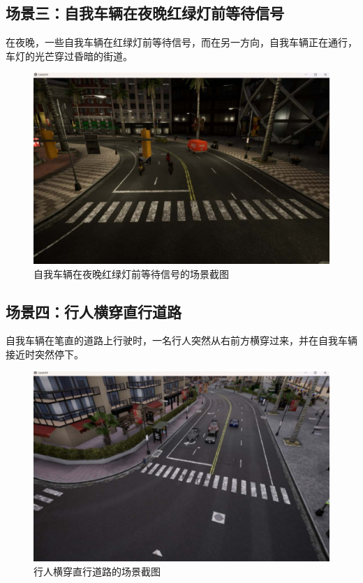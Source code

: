 \subsection{场景三：自我车辆在夜晚红绿灯前等待信号}
\indent 在夜晚，一些自我车辆在红绿灯前等待信号，而在另一方向，自我车辆正在通行，车灯的光芒穿过昏暗的街道。\\

\begin{figure}[H]
	\centering
	\includegraphics[width=1.0\textwidth]{"images/4.pdf"}
	\caption{自我车辆在夜晚红绿灯前等待信号的场景截图}
	\label{fig:night_redlight_cross}
\end{figure}

\subsection{场景四：行人横穿直行道路}
\indent 自我车辆在笔直的道路上行驶时，一名行人突然从右前方横穿过来，并在自我车辆接近时突然停下。\\

\begin{figure}[H]
	\centering
	\includegraphics[width=1.0\textwidth]{"images/5.pdf"}
	\caption{行人横穿直行道路的场景截图}
	\label{fig:pedestrian_crossing}
\end{figure}
